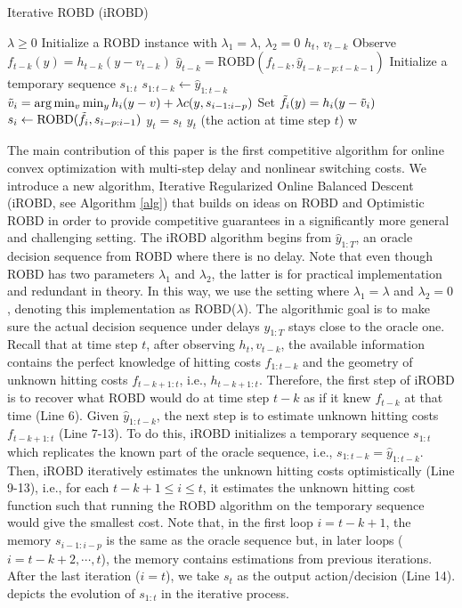 
\begin{algorithm}[t!]
   \caption{Iterative ROBD (iROBD)}
   \label{alg}
\begin{algorithmic}[1]
    $\lambda\ge0$
   \STATE Initialize a ROBD instance with $\lambda_1=\lambda$, $\lambda_2=0$
    $h_t$, $v_{t-k}$
   \STATE Observe $f_{t-k}(y)=h_{t-k}(y-v_{t-k})$
   \STATE $\hat{y}_{t-k} = \mathrm{ROBD}(f_{t-k},\hat{y}_{t-k-p:t-k-1})$\label{line:6}
   \STATE Initialize a temporary sequence $s_{1:t}$
   \STATE $s_{1:t-k} \leftarrow \hat{y}_{1:t-k}$
    \STATE $\Tilde{v}_i=\arg\min_v\min_yh_i(y-v)+\lambda c(y,s_{i-1:i-p})$
    \STATE Set $\Tilde{f}_i(y)=h_i(y-\Tilde{v}_i)$
    \STATE $s_i \leftarrow \mathrm{ROBD}(\Tilde{f}_i,s_{i-p:i-1})$
    \ENDFOR
   \STATE $y_t=s_t$
    $y_t$ (the action at time step $t$)
   \ENDFOR
w\end{algorithmic}
\end{algorithm}
The main contribution of this paper is the first competitive algorithm for online convex optimization with multi-step delay and nonlinear switching costs. We introduce a new algorithm, Iterative Regularized Online Balanced Descent (iROBD, see Algorithm \ref{alg}) that builds on ideas on ROBD and Optimistic ROBD in order to provide competitive guarantees in a significantly more general and challenging setting. The iROBD algorithm begins from $\hat{y}_{1:T}$, an oracle decision sequence from ROBD where there is no delay. Note that even though ROBD has two parameters $\lambda_1$ and $\lambda_2$, the latter is for practical implementation and redundant in theory. In this way, we use the setting where $\lambda_1=\lambda$ and $\lambda_2=0$, denoting this implementation as ROBD($\lambda$). The algorithmic goal is to make sure the actual decision sequence under delays $y_{1:T}$ stays close to the oracle one. Recall that at time step $t$, after observing $h_t,v_{t-k}$, the available information contains the perfect knowledge of hitting costs $f_{1:t-k}$ and the geometry of unknown hitting costs $f_{t-k+1:t}$, i.e., $h_{t-k+1:t}$. Therefore, the first step of iROBD is to recover what ROBD would do at time step $t-k$ as if it knew $f_{t-k}$ at that time (Line 6).
Given $\hat{y}_{1:t-k}$, the next step is to estimate unknown hitting costs $f_{t-k+1:t}$ (Line 7-13). To do this, iROBD initializes a temporary sequence $s_{1:t}$ which replicates the known part of the oracle sequence, i.e., $s_{1:t-k}=\hat{y}_{1:t-k}$. Then, iROBD iteratively estimates the unknown hitting costs optimistically (Line 9-13), i.e., for each $t-k+1\leq i\leq t$, it estimates the unknown hitting cost function such that running the ROBD algorithm on the temporary sequence would give the smallest cost. Note that, in the first loop $i=t-k+1$, the memory  $s_{i-1:i-p}$ is the same as the oracle sequence but, in later loops ($i=t-k+2,\cdots,t$), the memory contains estimations from previous iterations. After the last iteration ($i=t$), we take $s_t$ as the output action/decision (Line 14).  depicts the evolution of $s_{1:t}$ in the iterative process.

